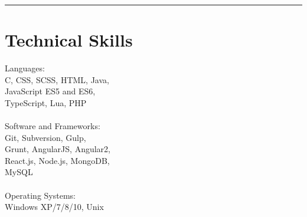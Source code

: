 \noindent\rule{0.9\hsize}{0.4pt}
\section{\normalsize{Technical Skills}}

Languages:\\
C, CSS, SCSS, HTML, Java,\\
JavaScript ES5 and ES6,\\
TypeScript, Lua, PHP\\
\\
Software and Frameworks:\\
Git, Subversion, Gulp,\\
Grunt, AngularJS, Angular2,\\
React.js, Node.js, MongoDB,\\
MySQL\\
\\
Operating Systems:\\
Windows XP/7/8/10, Unix\\
